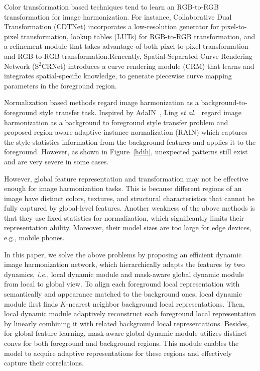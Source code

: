 \documentclass[sigconf]{acmart}
\begin{document}
Color transformation based techniques tend to learn an RGB-to-RGB transformation for image harmonization. For instance, Collaborative Dual Transformation (CDTNet)\cite{CDTNet} incorporates a low-resolution generator for pixel-to-pixel transformation, lookup tables (LUTs) for RGB-to-RGB transformation, and a refinement module that takes advantage of both pixel-to-pixel transformation and RGB-to-RGB transformation.Rencently, Spatial-Separated Curve Rendering Network (S$^2$CRNet)\cite{liang2021spatial} introduces a curve rendering module (CRM) that learns and integrates spatial-specific knowledge, to generate piecewise curve mapping parameters in the foreground region. 

Normalization based methods regard image harmonization as a background-to-foreground style transfer task. Inspired by AdaIN~\cite{AdaIN}, Ling \textit{et al.}~\cite{RAIN} regard image harmonization as a background to foreground style transfer problem and proposed region-aware adaptive instance normalization (RAIN) which captures the style statistics information from the background features and applies it to the foreground. However, as shown in Figure~\ref{hdih}, unexpected patterns still exist and are very severe in some cases. 


However, global feature representation and transformation may not be effective enough for image harmonization tasks. This is because different regions of an image have distinct colors, textures, and structural characteristics that cannot be fully captured by global-level features. Another weakness of the above methods is that they use fixed statistics for normalization, which significantly limits their representation ability. Moreover, their model sizes are too large for edge devices, e.g., mobile phones. 

In this paper, we solve the above problems by proposing an efficient dynamic image harmonization network, which hierarchically adapts the features by two dynamics, \emph{i.e.}, local dynamic module and mask-aware global dynamic module from local to global view. To align each foreground local representation with semantically and appearance matched to the background ones, local dynamic module first finds $K$-nearest neighbor background local representations. Then, local dynamic module adaptively reconstruct each foreground local representation by linearly combining it with related background local representations. Besides, for global feature learning, mask-aware global dynamic module utilizes distinct convs for both foreground and background regions. This module enables the model to acquire adaptive representations for these regions and effectively capture their correlations.
\end{document}
